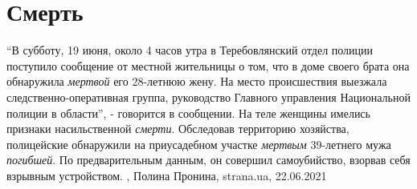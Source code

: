  
 
 
 
 
\chapter{Смерть}
\label{sec:slova.smert}

\enquote{В субботу, 19 июня, около 4 часов утра в Теребовлянский отдел полиции
поступило сообщение от местной жительницы о том, что в доме своего брата она
обнаружила \emph{мертвой} его 28-летнюю жену. На место происшествия выезжала
следственно-оперативная группа, руководство Главного управления Национальной
полиции в области}, - говорится в сообщении.  На теле женщины имелись признаки
насильственной \emph{смерти}. Обследовав территорию хозяйства, полицейские обнаружили
на приусадебном участке \emph{мертвым} 39-летнего мужа \emph{погибшей}. По предварительным
данным, он совершил самоубийство, взорвав себя взрывным устройством.
  , Полина Пронина, strana.ua, 22.06.2021
